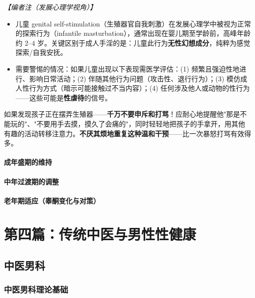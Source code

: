 \begin{enumerate}
\vspace{0.3em}
\noindent\textit{【编者注（发展心理学视角）】}
\begin{itemize}
	\item 儿童 genital self-stimulation（生殖器官自我刺激）在发展心理学中被视为正常的探索行为（infantile masturbation），通常出现在婴儿期至学龄前，高峰年龄约 $2$--$4$ 岁。关键区别于成人手淫的是：儿童此行为\textbf{无性幻想成分}，纯粹为感觉探索/自我安抚。
	\item 需要警惕的情况：如果儿童出现以下表现需医学评估：(1) 频繁且强迫性地进行、影响日常活动；(2) 伴随其他行为问题（攻击性、退行行为）；(3) 模仿成人性行为方式（暗示可能接触过不当内容）；(4) 任何涉及他人或动物的性行为——这些可能是\textbf{性虐待}的信号。
\end{itemize}

\begin{tcolorbox}[colback=pink!5!white,colframe=red!50!black,title=贴心小叮咛]
如果发现孩子正在摆弄生殖器——\textbf{千万不要申斥和打骂}！应耐心地提醒他"那是不能玩的"、"不要用手去摸，摸久了会痛的"，同时轻轻地把孩子的手拿开，用其他有趣的活动转移注意力。\textbf{不厌其烦地重复这种温和干预}——比一次暴怒打骂有效得多。
\end{tcolorbox}

\subsection{成年盛期的维持}
\subsection{中年过渡期的调整}
\subsection{老年期适应（睾酮变化与对策）}

\part{第四篇：传统中医与男性性健康}

\chapter{中医男科}

\section{中医男科理论基础}

\end{enumerate}
